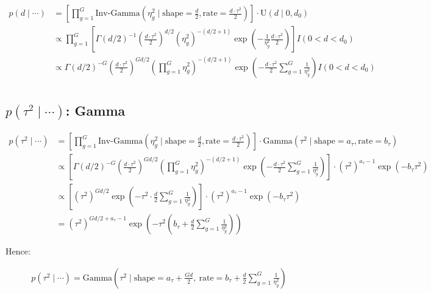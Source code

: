 \documentclass{article}\usepackage{graphicx, color}
\begin{document}
\begin{flushleft}
\begin{align*}
p(d \mid \cdots) &= \left [ \prod_{g = 1}^G \text{Inv-Gamma} \left ( \eta_g^2 \mid \text{shape} = \frac{d}{2}, \text{rate} = \frac{d \cdot \tau^2}{2} \right ) \right ] \cdot \text{U}(d \mid 0, d_0) \\ 
& \propto \prod_{g = 1}^G \left [  \Gamma \left( d/2 \right )^{-1} \left ( \frac{d \cdot \tau^2}{2}\right ) ^ {d  /2 } \left ( { \eta_g^2} \right )^{ -(d/2 + 1)} \exp \left (- \frac{1}{ \eta_g^2}\frac{d \cdot \tau^2}{2} \right ) \right ] I(0 < d < d_0) \\
& \propto \Gamma \left( d/2 \right )^{-G} \left ( \frac{d \cdot \tau^2}{2}\right ) ^ { G d  /2 } \left ( \prod_{g = 1}^G { \eta_g^2} \right )^{ -(d/2 + 1)} \exp \left (- \frac{d \cdot \tau^2}{2} \sum_{g = 1}^G \frac{1}{ \eta_g^2} \right ) I(0 < d < d_0) \\
\end{align*}

\subsection{$p(\tau^2 \mid \cdots)$: Gamma}

\begin{align*}
p(\tau^2 \mid \cdots) &= \left [ \prod_{g = 1}^G \text{Inv-Gamma} \left ( \eta_g^2 \mid \text{shape} = \frac{d}{2}, \text{rate} = \frac{d \cdot \tau^2}{2} \right ) \right ] \cdot \text{Gamma}(\tau^2 \mid \text{shape} = a_\tau, \text{rate} = b_\tau) \\
&\propto \left [ \Gamma \left( d/2 \right )^{-G} \left ( \frac{d \cdot \tau^2}{2}\right ) ^ { G d  /2 } \left ( \prod_{g = 1}^G { \eta_g^2} \right )^{ -(d/2 + 1)} \exp \left (- \frac{d \cdot \tau^2}{2} \sum_{g = 1}^G \frac{1}{ \eta_g^2} \right ) \right ] \cdot (\tau^2)^{a_\tau - 1} \exp \left (- b_\tau \tau^2 \right )  \\
& \propto \left [ \left ( \tau^2 \right ) ^ { G d  /2 } \exp \left (- \tau^2 \cdot \frac{d}{2} \sum_{g = 1}^G \frac{1}{ \eta_g^2} \right ) \right ] \cdot (\tau^2)^{a_\tau - 1} \exp \left (- b_\tau \tau^2 \right )  \\
&= (\tau^2)^{Gd/2 + a_\tau - 1} \exp \left (- \tau^2 \left (b_\tau + \frac{d}{2} \sum_{g = 1}^G \frac{1}{\eta_g^2} \right )  \right ) 
\end{align*}

Hence:

\begin{align*}
p(\tau^2 \mid \cdots) = \text{Gamma} \left ( \tau^2 \mid \text{shape} =  a_\tau + \frac{Gd}{2}, \ \text{rate} =  b_\tau + \frac{d}{2} \sum_{g = 1}^G \frac{1}{\eta_g^2} \right ) 
\end{align*}


\end{flushleft}
\end{document}
